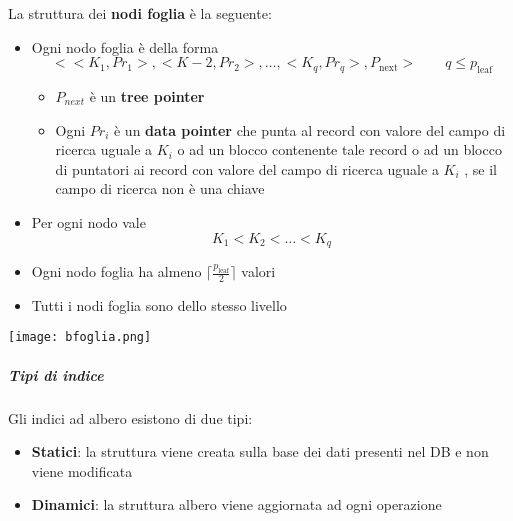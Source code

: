 La struttura dei \textbf{nodi foglia} è la seguente:
\begin{itemize}
	\item Ogni nodo foglia è della forma
	\begin{equation*}
		<<K_1, Pr_1>, <K-2, Pr_2>, \ldots, <K_q, Pr_q>, P_{\text{next}}> \qquad q \leq p_{\text{leaf}}
	\end{equation*}
	\begin{itemize}
		\item $P_{next}$ è un \textbf{tree pointer}
		\item Ogni $Pr_i$ è un \textbf{data pointer} che punta al record con valore del campo di ricerca uguale a $K_i$ o ad un blocco contenente tale record o ad un blocco di puntatori ai record con
		valore del campo di ricerca uguale a $K_i$ , se il campo di ricerca non è una chiave
	\end{itemize}
	\item Per ogni nodo vale
	\begin{equation*}
		K_1 < K_2 < \ldots < K_q
	\end{equation*}
	\item Ogni nodo foglia ha almeno $\lceil \frac{p_{\text{leaf}}}{2} \rceil$ valori
	\item Tutti i nodi foglia sono dello stesso livello
\end{itemize}

\begin{center}
	\texttt{[image: bfoglia.png]}
\end{center}

\subparagraph{Tipi di indice}
Gli indici ad albero esistono di due tipi:
\begin{itemize}
	\item \textbf{Statici}: la struttura viene creata sulla base dei dati presenti nel DB e non viene modificata
	\item \textbf{Dinamici}: la struttura albero viene aggiornata ad ogni operazione
\end{itemize}

